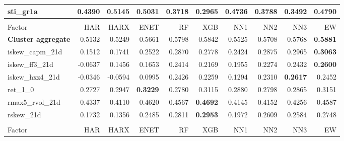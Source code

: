 \begin{longtable}{>{\raggedright\arraybackslash}p{2.6cm}rrrrrrrrr}
sti\_gr1a & 0.4390 & \textbf{\cellcolor{blue!10}0.5145} & \cellcolor{blue!10}0.5031 & 0.3718 & 0.2965 & \cellcolor{blue!10}0.4736 & 0.3788 & 0.3492 & \cellcolor{blue!10}0.4790 \\
\hline
\multicolumn{10}{@{}l}{\textit{Panel K. Short-Term Reversal}} \\
\hline
Factor & HAR & HARX & ENET & RF & XGB & NN1 & NN2 & NN3 & EW \\
\hline
\textbf{Cluster aggregate} & 0.5132 & \cellcolor{blue!10}0.5249 & \cellcolor{blue!10}0.5661 & \cellcolor{blue!10}0.5798 & \cellcolor{blue!10}0.5842 & \cellcolor{blue!10}0.5525 & \cellcolor{blue!10}0.5708 & \cellcolor{blue!10}0.5768 & \textbf{\cellcolor{blue!10}0.5881} \\
iskew\_capm\_21d & 0.1512 & \cellcolor{blue!10}0.1741 & \cellcolor{blue!10}0.2522 & \cellcolor{blue!10}0.2870 & \cellcolor{blue!10}0.2778 & \cellcolor{blue!10}0.2424 & \cellcolor{blue!10}0.2875 & \cellcolor{blue!10}0.2965 & \textbf{\cellcolor{blue!10}0.3063} \\
iskew\_ff3\_21d & -0.0637 & \cellcolor{blue!10}0.1456 & \cellcolor{blue!10}0.1653 & \cellcolor{blue!10}0.2414 & \cellcolor{blue!10}0.2169 & \cellcolor{blue!10}0.1955 & \cellcolor{blue!10}0.2274 & \cellcolor{blue!10}0.2432 & \textbf{\cellcolor{blue!10}0.2600} \\
iskew\_hxz4\_21d & -0.0346 & -0.0594 & \cellcolor{blue!10}0.0995 & \cellcolor{blue!10}0.2426 & \cellcolor{blue!10}0.2259 & \cellcolor{blue!10}0.1294 & \cellcolor{blue!10}0.2310 & \textbf{\cellcolor{blue!10}0.2617} & \cellcolor{blue!10}0.2452 \\
ret\_1\_0 & 0.2727 & \cellcolor{blue!10}0.2947 & \textbf{\cellcolor{blue!10}0.3229} & \cellcolor{blue!10}0.2780 & \cellcolor{blue!10}0.3115 & \cellcolor{blue!10}0.2880 & \cellcolor{blue!10}0.2798 & \cellcolor{blue!10}0.2865 & \cellcolor{blue!10}0.3151 \\
rmax5\_rvol\_21d & 0.4337 & 0.4110 & \cellcolor{blue!10}0.4620 & \cellcolor{blue!10}0.4567 & \textbf{\cellcolor{blue!10}0.4692} & 0.4145 & 0.4152 & 0.4256 & \cellcolor{blue!10}0.4587 \\
rskew\_21d & 0.1732 & 0.1356 & \cellcolor{blue!10}0.2485 & \cellcolor{blue!10}0.2811 & \textbf{\cellcolor{blue!10}0.2953} & \cellcolor{blue!10}0.1972 & \cellcolor{blue!10}0.2609 & \cellcolor{blue!10}0.2584 & \cellcolor{blue!10}0.2748 \\
\hline
\multicolumn{10}{@{}l}{\textit{Panel L. Size}} \\
\hline
Factor & HAR & HARX & ENET & RF & XGB & NN1 & NN2 & NN3 & EW \\

\end{longtable}
